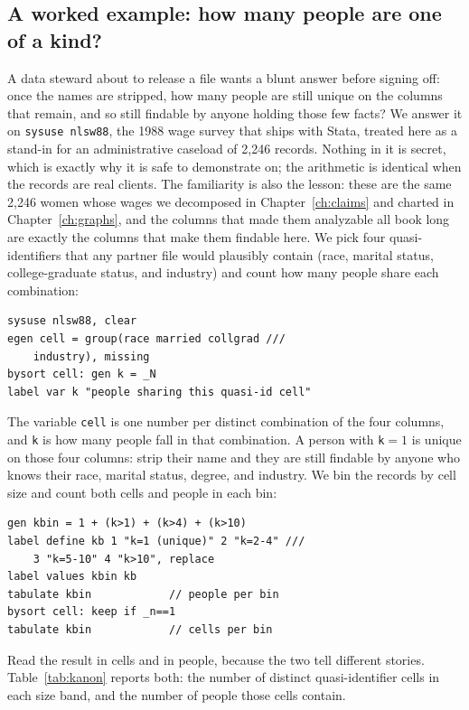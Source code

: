 \documentclass[
    a4paper,
    fontsize=10pt,
    twoside=true,
    numbers=noenddot,
]{kaobook}
\begin{document}
\subsection{A worked example: how many people are one of a kind?}\label{sec:kanon}
A data steward about to release a file wants a blunt answer before signing off: once the names are stripped, how many people are still unique on the columns that remain, and so still findable by anyone holding those few facts? We answer it on \texttt{sysuse nlsw88}, the 1988 wage survey that ships with Stata, treated here as a stand-in for an administrative caseload of 2{,}246 records. Nothing in it is secret, which is exactly why it is safe to demonstrate on; the arithmetic is identical when the records are real clients. The familiarity is also the lesson: these are the same 2{,}246 women whose wages we decomposed in Chapter~\ref{ch:claims} and charted in Chapter~\ref{ch:graphs}, and the columns that made them analyzable all book long are exactly the columns that make them findable here. We pick four quasi-identifiers that any partner file would plausibly contain (race, marital status, college-graduate status, and industry) and count how many people share each combination:
\par
{\footnotesize
\begin{verbatim}
sysuse nlsw88, clear
egen cell = group(race married collgrad ///
    industry), missing
bysort cell: gen k = _N
label var k "people sharing this quasi-id cell"
\end{verbatim}
}
The variable \texttt{cell} is one number per distinct combination of the four columns, and \texttt{k} is how many people fall in that combination. A person with \texttt{k}${}=1$ is unique on those four columns: strip their name and they are still findable by anyone who knows their race, marital status, degree, and industry. We bin the records by cell size and count both cells and people in each bin:
\par
{\footnotesize
\begin{verbatim}
gen kbin = 1 + (k>1) + (k>4) + (k>10)
label define kb 1 "k=1 (unique)" 2 "k=2-4" ///
    3 "k=5-10" 4 "k>10", replace
label values kbin kb
tabulate kbin            // people per bin
bysort cell: keep if _n==1
tabulate kbin            // cells per bin
\end{verbatim}
}
Read the result in cells and in people, because the two tell different stories. Table~\ref{tab:kanon} reports both: the number of distinct quasi-identifier cells in each size band, and the number of people those cells contain.
\end{document}
